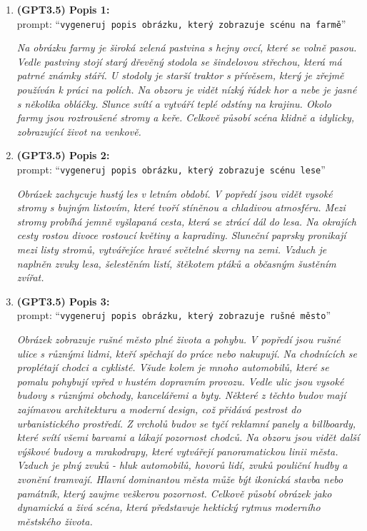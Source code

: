 \begin{enumerate}
	\item \textbf{(GPT3.5) Popis 1:} \\
	      prompt: \enquote{\texttt{vygeneruj popis obrázku, který zobrazuje scénu na farmě}}

	      \emph{Na obrázku farmy je široká zelená pastvina s hejny ovcí, které se volně pasou. Vedle pastviny stojí starý dřevěný stodola se šindelovou střechou, která má patrné známky stáří. U stodoly je starší traktor s přívěsem, který je zřejmě používán k práci na polích. Na obzoru je vidět nízký řádek hor a nebe je jasné s několika obláčky. Slunce svítí a vytváří teplé odstíny na krajinu. Okolo farmy jsou roztroušené stromy a keře. Celkově působí scéna klidně a idylicky, zobrazující život na venkově.}

	\item \textbf{(GPT3.5) Popis 2:} \\
	      prompt: \enquote{\texttt{vygeneruj popis obrázku, který zobrazuje scénu lese}}

	      \emph{Obrázek zachycuje hustý les v letním období. V popředí jsou vidět vysoké stromy s bujným listovím, které tvoří stíněnou a chladivou atmosféru. Mezi stromy probíhá jemně vyšlapaná cesta, která se ztrácí dál do lesa. Na okrajích cesty rostou divoce rostoucí květiny a kapradiny. Sluneční paprsky pronikají mezi listy stromů, vytvářejíce hravé světelné skvrny na zemi. Vzduch je naplněn zvuky lesa, šelestěním listí, štěkotem ptáků a občasným šustěním zvířat.}
	\item \textbf{(GPT3.5) Popis 3:} \\
	      prompt: \enquote{\texttt{vygeneruj popis obrázku, který zobrazuje rušné město}}

	      \emph{Obrázek zobrazuje rušné město plné života a pohybu. V popředí jsou rušné ulice s různými lidmi, kteří spěchají do práce nebo nakupují. Na chodnících se proplétají chodci a cyklisté. Všude kolem je mnoho automobilů, které se pomalu pohybují vpřed v hustém dopravním provozu.
		      Vedle ulic jsou vysoké budovy s různými obchody, kancelářemi a byty. Některé z těchto budov mají zajímavou architekturu a moderní design, což přidává pestrost do urbanistického prostředí. Z vrcholů budov se tyčí reklamní panely a billboardy, které svítí všemi barvami a lákají pozornost chodců.
		      Na obzoru jsou vidět další výškové budovy a mrakodrapy, které vytvářejí panoramatickou linii města. Vzduch je plný zvuků - hluk automobilů, hovorů lidí, zvuků pouliční hudby a zvonění tramvají.
		      Hlavní dominantou města může být ikonická stavba nebo památník, který zaujme veškerou pozornost. Celkově působí obrázek jako dynamická a živá scéna, která představuje hektický rytmus moderního městského života.}
\end{enumerate}
